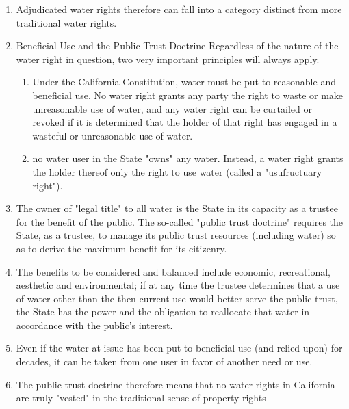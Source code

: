 \documentclass{article}
\begin{document}
\begin{enumerate}
\begin{itemize}
\begin{enumerate}
\item Adjudicated water rights therefore can fall into a category distinct from more traditional water rights. 
\item Beneficial Use and the Public Trust Doctrine Regardless of the nature of the water right in question, two very important principles will always apply. 
\begin{enumerate}
\item Under the California Constitution, water must be put to reasonable and beneficial use. No water right grants any party the right to waste or make unreasonable use of water, and any water right can be curtailed or revoked if it is determined that the holder of that right has engaged in a wasteful or unreasonable use of water. 
\item no water user in the State "owns" any water. Instead, a water right grants the holder thereof only the right to use water (called a "usufructuary right").
\end{enumerate} 
\item The owner of "legal title" to all water is the State in its capacity as a trustee for the benefit of the public. The so-called "public trust doctrine" requires the State, as a trustee, to manage its public trust resources (including water) so as to derive the maximum benefit for its citizenry. 
\item The benefits to be considered and balanced include economic, recreational, aesthetic and environmental; if at any time the trustee determines that a use of water other than the then current use would better serve the public trust, the State has the power and the obligation to reallocate that water in accordance with the public's interest. 
\item Even if the water at issue has been put to beneficial use (and relied upon) for decades, it can be taken from one user in favor of another need or use. 
\item The public trust doctrine therefore means that no water rights in California are truly "vested" in the traditional sense of property rights


\end{enumerate}
\end{itemize}
\end{enumerate}
\end{document}
